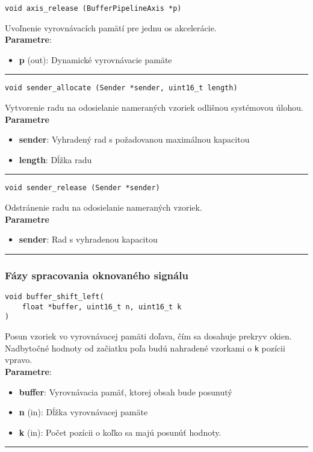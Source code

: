 \begin{lstlisting}[style=docs]
void axis_release (BufferPipelineAxis *p)
\end{lstlisting}
   Uvoľnenie vyrovnávacích pamätí pre jednu os akcelerácie. \\ 
\textbf{Parametre}:
\begin{itemize}[noitemsep, topsep=0pt]
	\item \textbf{p} (out): Dynamické vyrovnávacie pamäte
\end{itemize}
\bigbreak
\hrule

\begin{lstlisting}[style=docs]
void sender_allocate (Sender *sender, uint16_t length)
\end{lstlisting}
    Vytvorenie radu na odosielanie nameraných vzoriek odlišnou systémovou úlohou. \\ 
\textbf{Parametre}
\begin{itemize}[noitemsep, topsep=0pt]
	\item \textbf{sender}: Vyhradený rad s požadovanou maximálnou kapacitou
	\item \textbf{length}: Dĺžka radu
\end{itemize}
\bigbreak
\hrule

\begin{lstlisting}[style=docs]
void sender_release (Sender *sender)
\end{lstlisting}
   Odstránenie radu na odosielanie nameraných vzoriek. \\ 
\textbf{Parametre}
\begin{itemize}[noitemsep, topsep=0pt]
	\item \textbf{sender}: Rad s vyhradenou kapacitou
\end{itemize}
\bigbreak
\hrule


\subsubsection*{Fázy spracovania oknovaného signálu}
\begin{lstlisting}[style=docs]
void buffer_shift_left(
	float *buffer, uint16_t n, uint16_t k
)
\end{lstlisting}
Posun vzoriek vo vyrovnávacej pamäti doľava, čím sa dosahuje prekryv okien. 
Nadbytočné hodnoty od začiatku poľa budú nahradené vzorkami o \verb|k| pozícii vpravo. \\ 
\textbf{Parametre}:
\begin{itemize}[noitemsep, topsep=0pt]
	\item \textbf{buffer}: Vyrovnávacia pamäť, ktorej obsah bude posunutý
 	\item \textbf{n} (in): Dĺžka vyrovnávacej pamäte
	\item \textbf{k} (in): Počet pozícii o koľko sa majú posunúť hodnoty.
\end{itemize}
\bigbreak
\hrule

